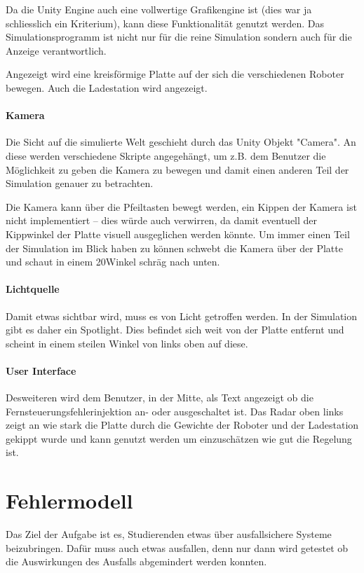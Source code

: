 Da die Unity Engine auch eine vollwertige Grafikengine ist (dies war ja schliesslich ein Kriterium),
kann diese Funktionalit{\"{a}}t genutzt werden. Das Simulationsprogramm ist nicht nur f{\"{u}}r die
reine Simulation sondern auch f{\"{u}}r die Anzeige verantwortlich.

Angezeigt wird eine kreisf{\"{o}}rmige Platte auf der sich die verschiedenen Roboter bewegen. Auch die
Ladestation wird angezeigt.

\paragraph{Kamera} Die Sicht auf die simulierte Welt geschieht durch das Unity Objekt "Camera". An diese
werden verschiedene Skripte angegeh{\"{a}}ngt, um z.B. dem Benutzer die M{\"{o}}glichkeit zu
geben die Kamera zu bewegen und damit einen anderen Teil der Simulation genauer zu betrachten.

Die Kamera kann {\"{u}}ber die Pfeiltasten bewegt werden, ein Kippen der Kamera ist nicht implementiert --
dies w{\"{u}}rde auch verwirren, da damit eventuell der Kippwinkel der Platte visuell ausgeglichen
werden k{\"{o}}nnte. Um immer einen Teil der Simulation im Blick haben zu k{\"{o}}nnen schwebt die Kamera
{\"{u}}ber der Platte und schaut in einem 20\textdegree Winkel schr{\"{a}}g nach unten.

\paragraph{Lichtquelle} Damit etwas sichtbar wird, muss es von Licht getroffen werden. In der Simulation
gibt es daher ein Spotlight. Dies befindet sich weit von der Platte entfernt und scheint in einem steilen Winkel
von links oben auf diese.

\paragraph{User Interface} Desweiteren wird dem Benutzer, in der Mitte, als Text angezeigt ob die
Fernsteuerungsfehlerinjektion an- oder ausgeschaltet ist. Das Radar oben links zeigt an wie stark die Platte
durch die Gewichte der Roboter und der Ladestation gekippt wurde und kann genutzt werden um einzusch{\"{a}}tzen
wie gut die Regelung ist.


\clearpage
\section{Fehlermodell}\label{fm}
Das Ziel der Aufgabe ist es, Studierenden etwas {\"{u}}ber ausfallsichere Systeme beizubringen. Daf{\"{u}}r
muss auch etwas ausfallen, denn nur dann wird getestet ob die Auswirkungen des Ausfalls abgemindert werden 
konnten.

